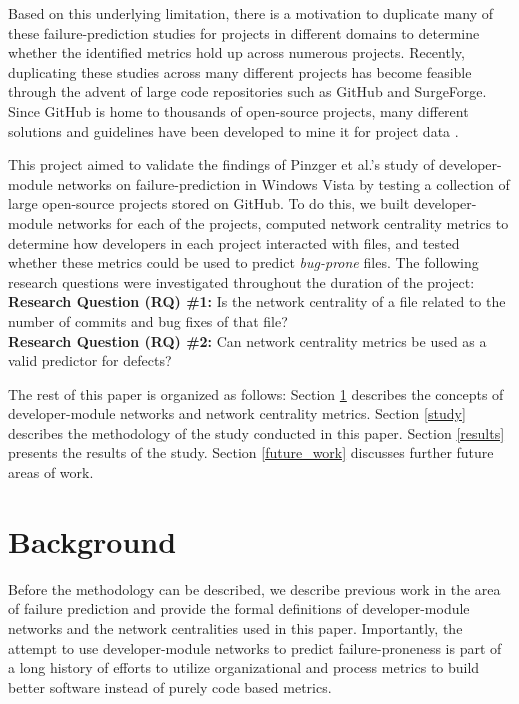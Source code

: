 \documentclass{sig-alternate-05-2015}
\begin{document}
Based on this underlying limitation, there is a motivation to duplicate many of these failure-prediction studies for projects in different domains to determine whether the identified metrics hold up across numerous projects. Recently, duplicating these studies across many different projects has become feasible through the advent of large code repositories such as GitHub and SurgeForge. Since GitHub is home to thousands of open-source projects, many different solutions and guidelines have been developed to mine it for project data \cite{Kalliamvakou:GitHub}.

This project aimed to validate the findings of Pinzger et al.'s study of developer-module networks on failure-prediction in Windows Vista by testing a collection of large open-source projects stored on GitHub. To do this, we built developer-module networks for each of the projects, computed network centrality metrics to determine how developers in each project interacted with files, and tested whether these metrics could be used to predict \textit{bug-prone} files. The following research questions were investigated throughout the duration of the project:
\\ \textbf{Research Question (RQ) \#1:} Is the network centrality of a file related to the number of commits and bug fixes of that file?
\\ \textbf{Research Question (RQ) \#2:} Can network centrality metrics be used as a valid predictor for defects?

The rest of this paper is organized as follows: Section \ref{background} describes the concepts of developer-module networks and network centrality metrics. Section \ref{study} describes the methodology of the study conducted in this paper. Section \ref{results} presents the results of the study. Section \ref{future_work} discusses further future areas of work.

\section{Background}
\label{background}
Before the methodology can be described, we describe previous work in the area of failure prediction and provide the formal definitions of developer-module networks and the network centralities used in this paper. Importantly, the attempt to use developer-module networks to predict failure-proneness is part of a long history of efforts to utilize organizational and process metrics to build better software instead of purely code based metrics.
\end{document}
